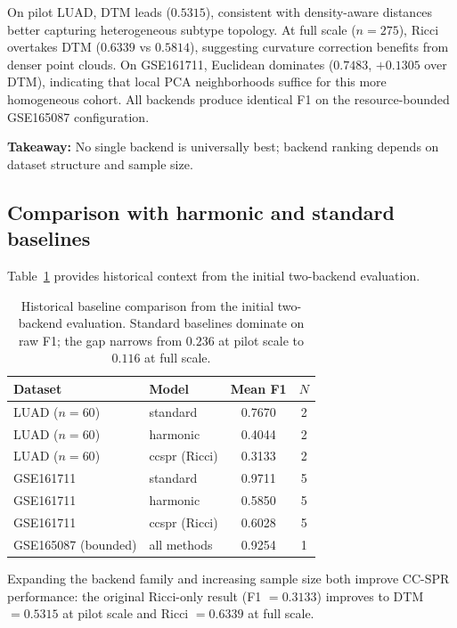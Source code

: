 \documentclass[12pt]{article}
\begin{document}
On pilot LUAD, DTM leads ($0.5315$), consistent with density-aware distances better capturing heterogeneous subtype topology.
At full scale ($n = 275$), Ricci overtakes DTM ($0.6339$ vs $0.5814$), suggesting curvature correction benefits from denser point clouds.
On GSE161711, Euclidean dominates ($0.7483$, $+0.1305$ over DTM), indicating that local PCA neighborhoods suffice for this more homogeneous cohort.
All backends produce identical F1 on the resource-bounded GSE165087 configuration.

\textbf{Takeaway:} No single backend is universally best; backend ranking depends on dataset structure and sample size.

\subsection{Comparison with harmonic and standard baselines}

Table~\ref{tab:baselines} provides historical context from the initial two-backend evaluation.

\begin{table}[h]
\centering
\small
\begin{tabular}{llcc}
\toprule
Dataset & Model & Mean F1 & $N$ \\
\midrule
LUAD ($n=60$) & standard & 0.7670 & 2 \\
LUAD ($n=60$) & harmonic & 0.4044 & 2 \\
LUAD ($n=60$) & ccspr (Ricci) & 0.3133 & 2 \\
\midrule
GSE161711 & standard & 0.9711 & 5 \\
GSE161711 & harmonic & 0.5850 & 5 \\
GSE161711 & ccspr (Ricci) & 0.6028 & 5 \\
\midrule
GSE165087 (bounded) & all methods & 0.9254 & 1 \\
\bottomrule
\end{tabular}
\caption{Historical baseline comparison from the initial two-backend evaluation. Standard baselines dominate on raw F1; the gap narrows from $0.236$ at pilot scale to $0.116$ at full scale.}
\label{tab:baselines}
\end{table}

Expanding the backend family and increasing sample size both improve CC-SPR performance: the original Ricci-only result (F1 $= 0.3133$) improves to DTM $= 0.5315$ at pilot scale and Ricci $= 0.6339$ at full scale.
\end{document}
